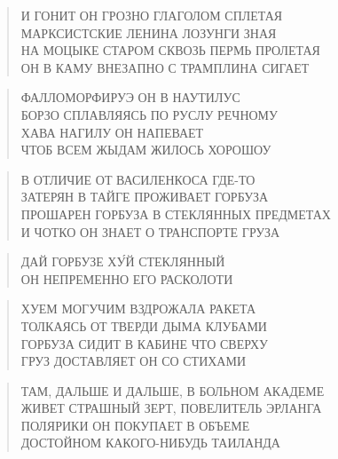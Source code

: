 \poemtitle{***}
\begin{verse}
И ГОНИТ ОН ГРОЗНО ГЛАГОЛОМ СПЛЕТАЯ\\
МАРКСИСТСКИЕ ЛЕНИНА ЛОЗУНГИ ЗНАЯ\\
НА МОЦЫКЕ СТАРОМ СКВОЗЬ ПЕРМЬ ПРОЛЕТАЯ\\
ОН В КАМУ ВНЕЗАПНО С ТРАМПЛИНА СИГАЕТ
\end{verse}

\poemtitle{***}
\begin{verse}
ФАЛЛОМОРФИРУЭ ОН В НАУТИЛУС\\
БОРЗО СПЛАВЛЯЯСЬ ПО РУСЛУ РЕЧНОМУ\\
ХАВА НАГИЛУ ОН НАПЕВАЕТ\\
ЧТОБ ВСЕМ ЖЫДАМ ЖИЛОСЬ ХОРОШОУ
\end{verse}

\poemtitle{***}
\begin{verse}
В ОТЛИЧИЕ ОТ ВАСИЛЕНКОСА ГДЕ-ТО\\
ЗАТЕРЯН В ТАЙГЕ ПРОЖИВАЕТ ГОРБУЗА\\
ПРОШАРЕН ГОРБУЗА В СТЕКЛЯННЫХ ПРЕДМЕТАХ\\
И ЧОТКО ОН ЗНАЕТ О ТРАНСПОРТЕ ГРУЗА
\end{verse}

\poemtitle{***}
\begin{verse}
ДАЙ ГОРБУЗЕ ХУ́Й СТЕКЛЯННЫЙ\\
ОН НЕПРЕМЕННО ЕГО РАСКОЛОТИ
\end{verse}

\poemtitle{***}
\begin{verse}
ХУЕМ МОГУЧИМ ВЗДРОЖАЛА РАКЕТА\\
ТОЛКАЯСЬ ОТ ТВЕРДИ ДЫМА КЛУБАМИ\\
ГОРБУЗА СИДИТ В КАБИНЕ ЧТО СВЕРХУ\\
ГРУЗ ДОСТАВЛЯЕТ ОН СО СТИХАМИ
\end{verse}

\poemtitle{***}
\begin{verse}
ТАМ, ДАЛЬШЕ И ДАЛЬШЕ, В БОЛЬНОМ АКАДЕМЕ\\
ЖИВЕТ СТРАШНЫЙ ЗЕРТ, ПОВЕЛИТЕЛЬ ЭРЛАНГА\\
ПОЛЯРИКИ ОН ПОКУПАЕТ В ОБЪЕМЕ\\
ДОСТОЙНОМ КАКОГО-НИБУДЬ ТАИЛАНДА
\end{verse}

